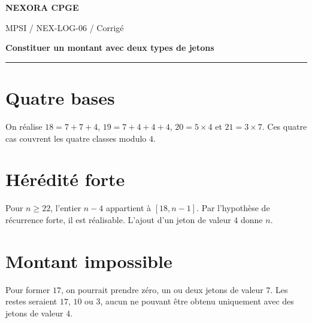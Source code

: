 \documentclass[11pt,a4paper]{article}
\begin{document}
{\small\bfseries\color{nexorablue} NEXORA CPGE}\par
{\small MPSI / NEX-LOG-06 / Corrigé}\par
{\LARGE\bfseries Constituer un montant avec deux types de jetons}\par
\vspace{0.25em}\hrule\vspace{0.6em}

\section*{Quatre bases}
On réalise $18=7+7+4$, $19=7+4+4+4$, $20=5\times4$ et $21=3\times7$. Ces quatre cas couvrent les quatre classes modulo $4$.

\section*{Hérédité forte}
Pour $n\ge22$, l’entier $n-4$ appartient à $[18,n-1]$. Par l’hypothèse de récurrence forte, il est réalisable. L’ajout d’un jeton de valeur $4$ donne $n$.

\section*{Montant impossible}
Pour former $17$, on pourrait prendre zéro, un ou deux jetons de valeur $7$. Les restes seraient $17$, $10$ ou $3$, aucun ne pouvant être obtenu uniquement avec des jetons de valeur $4$.
\end{document}
